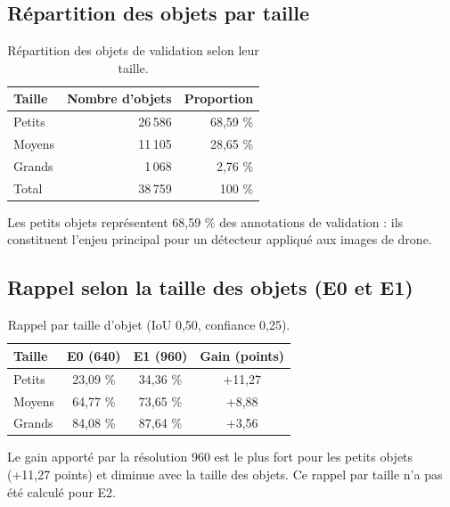\documentclass[11pt,a4paper]{article}
\begin{document}
\subsection{Répartition des objets par taille}
\begin{table}[htbp]
\centering
\small
\begin{tabular}{@{}lrr@{}}
\toprule
Taille & Nombre d'objets & Proportion \\
\midrule
Petits & 26\,586 & 68,59 \% \\
Moyens & 11\,105 & 28,65 \% \\
Grands & 1\,068 & 2,76 \% \\
\midrule
Total & 38\,759 & 100 \% \\
\bottomrule
\end{tabular}
\caption{Répartition des objets de validation selon leur taille.}
\label{tab:tailles}
\end{table}

Les petits objets représentent 68,59 \% des annotations de validation : ils
constituent l'enjeu principal pour un détecteur appliqué aux images de drone.

\subsection{Rappel selon la taille des objets (E0 et E1)}
\begin{table}[htbp]
\centering
\small
\begin{tabular}{@{}lccc@{}}
\toprule
Taille & E0 (640) & E1 (960) & Gain (points) \\
\midrule
Petits & 23,09 \% & 34,36 \% & +11,27 \\
Moyens & 64,77 \% & 73,65 \% & +8,88 \\
Grands & 84,08 \% & 87,64 \% & +3,56 \\
\bottomrule
\end{tabular}
\caption{Rappel par taille d'objet (IoU 0,50, confiance 0,25).}
\label{tab:rappel-taille}
\end{table}

Le gain apporté par la résolution 960 est le plus fort pour les petits objets
(+11,27 points) et diminue avec la taille des objets. Ce rappel par taille
n'a pas été calculé pour E2.
\end{document}
